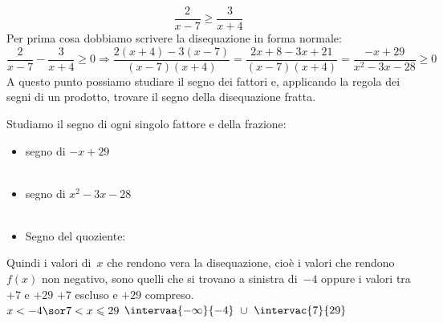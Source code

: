 \begin{esempio}{}{}
 \[\frac{2}{x-7} \geqslant \frac{3}{x+4}\]
Per prima cosa dobbiamo scrivere la disequazione in forma normale:
{\small
 \[\frac{2}{x-7} - \frac{3}{x+4} \geqslant 0 \Rightarrow 
   \frac{2(x+4) - 3(x-7)}{(x-7)(x+4)} = 
   \frac{2 x +8 -3x +21}{(x-7)(x+4)} =
   \frac{-x +29}{x^2-3x-28} \geqslant 0\]
} %
A questo punto possiamo studiare il segno dei fattori e, applicando la regola 
dei segni di un prodotto, trovare il segno della disequazione fratta.

Studiamo il segno di ogni singolo fattore e della frazione:
\begin{itemize}[left=0mm]
\item  segno di \(-x +29\)\\%
\\

\item segno di \(x^2-3x-28\)\\[-2mm]
\hspace*{-3mm}\\
\hspace*{-3mm}

\item Segno del quoziente: \quad %
\raisebox{-10mm}
{
{\segnofrazionea}}
\end{itemize}

Quindi i valori di~\(x\) che rendono vera la disequazione, cioè 
i valori  che rendono~\(f(x)\) non negativo, sono quelli 
che si trovano a sinistra di~\(-4\) oppure i valori tra \(+7\) e \(+29\) 
\(+7\) escluso e \(+29\) compreso.\\
\inssol
  {\solfrazionea}
  {\(x < -4 \sor 7 < x \leqslant 29\)}
  {\(\intervaa{-\infty}{-4}~\cup~\intervac{7}{29}\)}
\end{esempio}

